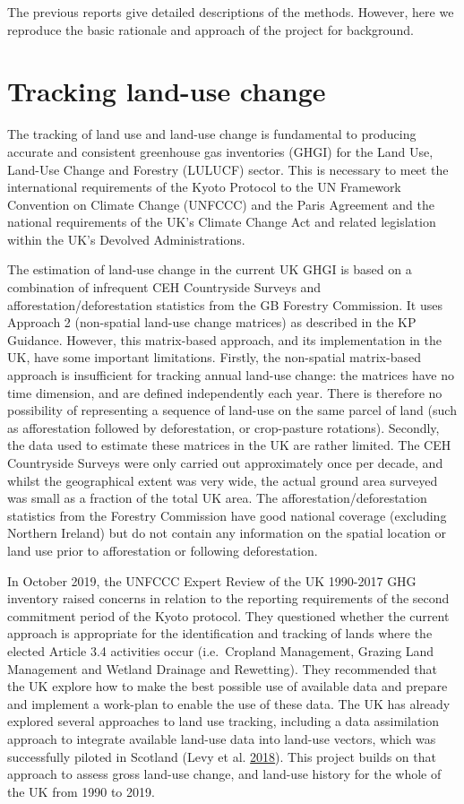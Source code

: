 \documentclass[
]{book}
\begin{document}
The previous reports give detailed descriptions of the methods. However, here we reproduce the basic rationale and approach of the project for background.

\hypertarget{tracking-land-use-change}{%
\section{Tracking land-use change}\label{tracking-land-use-change}}

The tracking of land use and land-use change is fundamental to producing accurate and consistent greenhouse gas inventories (GHGI) for the Land Use, Land-Use Change and Forestry (LULUCF) sector. This is necessary to meet the international requirements of the Kyoto Protocol to the UN Framework Convention on Climate Change (UNFCCC) and the Paris Agreement and the national requirements of the UK's Climate Change Act and related legislation within the UK's Devolved Administrations.

The estimation of land-use change in the current UK GHGI is based on a combination of infrequent CEH Countryside Surveys and afforestation/deforestation statistics from the GB Forestry Commission. It uses Approach 2 (non-spatial land-use change matrices) as described in the KP Guidance. However, this matrix-based approach, and its implementation in the UK, have some important limitations. Firstly, the non-spatial matrix-based approach is insufficient for tracking annual land-use change: the matrices have no time dimension, and are defined independently each year. There is therefore no possibility of representing a sequence of land-use on the same parcel of land (such as afforestation followed by deforestation, or crop-pasture rotations). Secondly, the data used to estimate these matrices in the UK are rather limited. The CEH Countryside Surveys were only carried out approximately once per decade, and whilst the geographical extent was very wide, the actual ground area surveyed was small as a fraction of the total UK area. The afforestation/deforestation statistics from the Forestry Commission have good national coverage (excluding Northern Ireland) but do not contain any information on the spatial location or land use prior to afforestation or following deforestation.

In October 2019, the UNFCCC Expert Review of the UK 1990-2017 GHG inventory raised concerns in relation to the reporting requirements of the second commitment period of the Kyoto protocol. They questioned whether the current approach is appropriate for the identification and tracking of lands where the elected Article 3.4 activities occur (i.e.~Cropland Management, Grazing Land Management and Wetland Drainage and Rewetting). They recommended that the UK explore how to make the best possible use of available data and prepare and implement a work-plan to enable the use of these data. The UK has already explored several approaches to land use tracking, including a data assimilation approach to integrate available land-use data into land-use vectors, which was successfully piloted in Scotland (Levy et al. \protect\hyperlink{ref-Levy2018}{2018}). This project builds on that approach to assess gross land-use change, and land-use history for the whole of the UK from 1990 to 2019.
\end{document}

